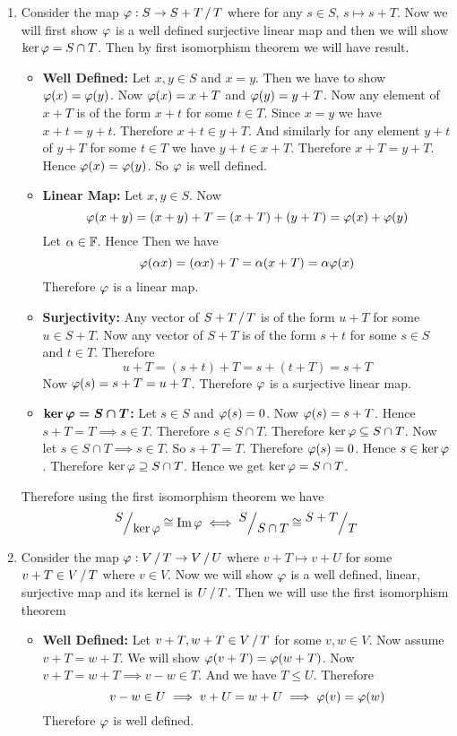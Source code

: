 \documentclass[a4paper, 11pt]{article}
\begin{document}
{\begin{enumerate}[label=(\alph*)]
\item Consider the map $\vph:S\to \quotient{S+T}{T}$ where for any $s\in S$, $s\mapsto s+T$. Now we will first show $\varphi $ is a well defined surjective linear map and then we will show $\ker\varphi=S\cap T$. Then by first isomorphism theorem we will have result.\begin{itemize}
	\item \textbf{Well Defined:} Let $x,y\in S$ and $x=y$. Then we have to show $\varphi(x)=\varphi(y)$. Now $\varphi(x)=x+T$ and $\varphi(y)=y+T$. Now any element of $x+T$ is of the form $x+t$ for some $t\in T$. Since $x=y$ we have $x+t=y+t$. Therefore $x+t\in y+T$. And similarly  for any element $y+t$ of $y+T$ for some $t\in T$ we have $y+t\in x+T$. Therefore $x+T=y+T$. Hence $\varphi(x)=\varphi(y)$. So $\varphi$ is well defined.
	\item \textbf{Linear Map:} Let $x,y\in S$. Now $$\varphi(x+y)=(x+y)+T=(x+T)+(y+T)=\varphi(x)+\varphi(y)$$Let $\alpha\in\mathbb{F}$. Hence Then we have $$\varphi(\alpha x)=(\alpha x)+T=\alpha(x+T)=\alpha\varphi(x)$$Therefore $\varphi$ is a linear map. 
	\item \textbf{Surjectivity:} Any vector of $\quotient{S+T}T$ is of the form $u+T $ for some $u\in S+T$. Now any vector of $S+T$ is of the form $s+t$ for some $s\in S$ and $t\in T$. Therefore $$u+T=(s+t)+T=s+(t+T)=s+T$$Now $\varphi(s)=s+T=u+T$. Therefore $\varphi$ is a surjective linear map. 
	\item $\boldsymbol{\ker\varphi=S\cap T}$\textbf{:} Let $s\in S$ and $\varphi(s)=0$. Now $\varphi(s)=s+T$. Hence $s+T=T\implies s\in T$. Therefore $s\in S\cap T$. Therefore $\ker\varphi\subseteq S\cap T$. Now let $s\in S\cap T\implies s\in T$. So $s+T=T$. Therefore $\varphi(s)=0$. Hence $s\in \ker\varphi$. Therefore $\ker\varphi\supseteq S\cap T$. Hence we get $\ker\varphi=S\cap T$. 
\end{itemize}
Therefore using the first isomorphism theorem we have $$\quotient{S}{\ker\vph}\cong \Im\vph\iff \quotient{S}{S\cap T}\cong \quotient{S+T}{T}$$
\item Consider the map $\vph:\quotient{V}T\to \quotient{V}{U}$ where $v+T\mapsto v+U$ for some $v+T\in \quotient{V}T$ where $v\in V$. Now we will show $\varphi$ is a well defined, linear, surjective map and its kernel is $\quotient{U}T$. Then we will use the first isomorphism theorem
\begin{itemize}
	\item \textbf{Well Defined:} Let $v+T,w+T\in\quotient{V}{T}$ for some $v,w\in V$. Now assume $v+T=w+T$. We will show $\varphi(v+T)=\varphi(w+T)$. Now $v+T=w+T\implies v-w\in T$. And we have $T\leq U$. Therefore $$v-w\in U\implies v+U=w+U\implies \varphi(v)=\varphi(w)$$Therefore $\varphi$ is well defined.

\end{itemize}
\end{enumerate}}
\end{document}
